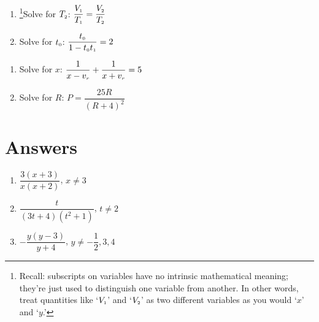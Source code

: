 \documentclass[11pt]{article}
\theoremstyle{definition}  %
\newcounter{HW}
\begin{document}
\begin{multicols}{2}
\begin{enumerate}
\setcounter{enumi}{\value{HW}}

\item\hspace{-0.1in}\footnote{Recall: subscripts on variables have no intrinsic mathematical meaning; they're just used to distinguish one variable from another.  In other words, treat quantities like `$V_{\text{\tiny $1$}}$' and `$V_{\text{\tiny $2$}}$'  as two different variables as you would `$x$' and `$y$.'}Solve for $T_{\text{\tiny $2$}}$:  $\dfrac{V_{\text{\tiny $1$}}}{T_{\text{\tiny $1$}}} = \dfrac{V_{\text{\tiny $2$}}}{T_{\text{\tiny $2$}}}$


\item  Solve for $t_{\text{\tiny $0$}}$:  $\dfrac{t_{\text{\tiny $0$}}}{1-t_{\text{\tiny $0$}}t_{\text{\tiny $1$}}} = 2$ 

\setcounter{HW}{\value{enumi}}
\end{enumerate}
\end{multicols}

\begin{multicols}{2}
\begin{enumerate}
\setcounter{enumi}{\value{HW}}


\item  Solve for $x$:  $\dfrac{1}{x - v_{\text{\tiny $r$}}} + \dfrac{1}{x + v_{\text{\tiny $r$}}} = 5$

\item Solve for $R$:  $P = \dfrac{25R}{(R+4)^2}$ \label{litrateqnlast}

\setcounter{HW}{\value{enumi}}
\end{enumerate}
\end{multicols}

\newpage

\section{Answers}

\begin{multicols}{3}
\begin{enumerate}

\item $\dfrac{3(x+3)}{x(x+2)}$, $x \neq 3$
\item $\dfrac{t}{(3t+4)(t^2+1)}$, $t \neq 2$
\item $-\dfrac{y(y-3)}{y+4}$, $y \neq -\dfrac{1}{2}, 3, 4$ 

\setcounter{HW}{\value{enumi}}
\end{enumerate}
\end{multicols}
\end{document}
